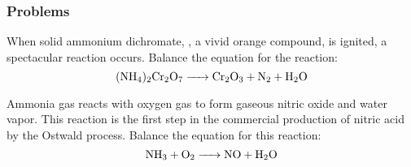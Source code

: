     \subsubsection{Problems}
    \begin{problem}
    When solid ammonium dichromate, , a vivid orange compound, is ignited, a spectacular reaction occurs. Balance the equation for the reaction: $$\ce{(NH4)2Cr2O7 -> Cr2O3 + N2 + H2O}$$
    \end{problem}
    \begin{problem}
    Ammonia gas reacts with oxygen gas to form gaseous nitric oxide and water vapor. This reaction is the first step in the commercial production of nitric acid by the Ostwald process. Balance the equation for this reaction:
    $$\ce{NH3 + O2 -> NO + H2O}$$
    \end{problem}
